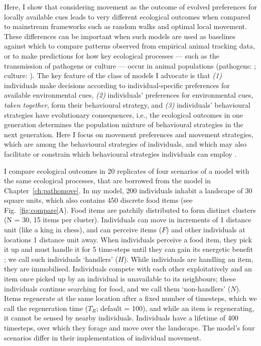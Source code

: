 Here, I show that considering movement as the outcome of evolved preferences for locally available cues leads to very different ecological outcomes when compared to mainstream frameworks such as random walks and optimal local movement.
These differences can be important when such models are used as baselines against which to compare patterns observed from empirical animal tracking data, or to make predictions for how key ecological processes --- such as the transmission of pathogens or culture --- occur in animal populations (pathogens: \cite{white2018,white2018b,cantor2021,scherer2020}; culture: \cite{romano2020,romano2021,cantor2021,cantor2021a}).
The key feature of the class of models I advocate is that \textit{(1)} individuals make decisions according to individual-specific preferences for available environmental cues, \textit{(2)} individuals' preferences for environmental cues, \textit{taken together}, form their behavioural strategy, and \textit{(3)} individuals' behavioural strategies have evolutionary consequences, i.e., the ecological outcomes in one generation determines the population mixture of behavioural strategies in the next generation.
Here I focus on movement preferences and movement strategies, which are among the behavioural strategies of individuals, and which may also facilitate or constrain which behavioural strategies individuals can employ \citep{nathan2008a,spiegel2017}.

I compare ecological outcomes in 20 replicates of four scenarios of a model with the same ecological processes, that are borrowed from the model in Chapter~\ref{ch:pathomove}.
In my model, 200 individuals inhabit a landscape of 30 square units, which also contains 450 discrete food items (see Fig.~\ref{fig:compare}A).
Food items are patchily distributed to form distinct clusters (N = 30, 15 items per cluster).
Individuals can move in increments of 1 distance unit (like a king in chess), and can perceive items ($F$) and other individuals at locations 1 distance unit away.
When individuals perceive a food item, they pick it up and must handle it for 5 time-steps until they can gain its energetic benefit \citep{ruxton1992,gupte2021a,gupte2022c}; we call such individuals `handlers' ($H$).
While individuals are handling an item, they are immobilised.
Individuals compete with each other exploitatively and an item once picked up by an individual is unavailable to its neighbours; these individuals continue searching for food, and we call them `non-handlers' ($N$).
Items regenerate at the same location after a fixed number of timesteps, which we call the regeneration time ($T_R$; default = 100), and while an item is regenerating, it cannot be sensed by nearby individuals.
Individuals have a lifetime of 400 timesteps, over which they forage and move over the landscape.
The model's four scenarios differ in their implementation of individual movement.

